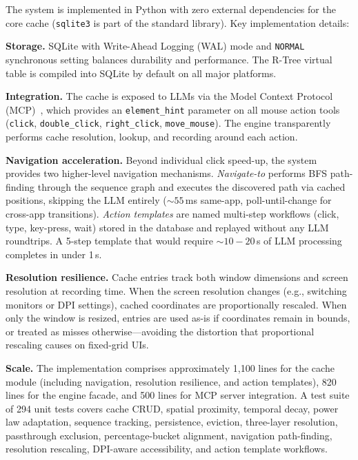 \documentclass[conference]{IEEEtran}
\begin{document}
The system is implemented in Python with zero external dependencies for the core cache (\texttt{sqlite3} is part of the standard library). Key implementation details:

\textbf{Storage.} SQLite with Write-Ahead Logging (WAL) mode and \texttt{NORMAL} synchronous setting balances durability and performance. The R-Tree virtual table is compiled into SQLite by default on all major platforms.

\textbf{Integration.} The cache is exposed to LLMs via the Model Context Protocol (MCP)~\cite{mcp2024}, which provides an \texttt{element\_hint} parameter on all mouse action tools (\texttt{click}, \texttt{double\_click}, \texttt{right\_click}, \texttt{move\_mouse}). The engine transparently performs cache resolution, lookup, and recording around each action.

\textbf{Navigation acceleration.} Beyond individual click speed-up, the system provides two higher-level navigation mechanisms. \emph{Navigate-to} performs BFS path-finding through the sequence graph and executes the discovered path via cached positions, skipping the LLM entirely (${\sim}55$\,ms same-app, poll-until-change for cross-app transitions). \emph{Action templates} are named multi-step workflows (click, type, key-press, wait) stored in the database and replayed without any LLM roundtrips. A 5-step template that would require ${\sim}10{-}20$\,s of LLM processing completes in under 1\,s.

\textbf{Resolution resilience.} Cache entries track both window dimensions and screen resolution at recording time. When the screen resolution changes (e.g., switching monitors or DPI settings), cached coordinates are proportionally rescaled. When only the window is resized, entries are used as-is if coordinates remain in bounds, or treated as misses otherwise---avoiding the distortion that proportional rescaling causes on fixed-grid UIs.

\textbf{Scale.} The implementation comprises approximately 1{,}100 lines for the cache module (including navigation, resolution resilience, and action templates), 820 lines for the engine facade, and 500 lines for MCP server integration. A test suite of 294 unit tests covers cache CRUD, spatial proximity, temporal decay, power law adaptation, sequence tracking, persistence, eviction, three-layer resolution, passthrough exclusion, percentage-bucket alignment, navigation path-finding, resolution rescaling, DPI-aware accessibility, and action template workflows.
\end{document}
